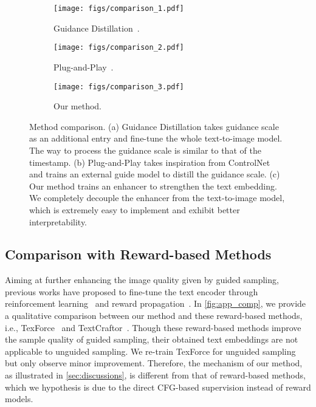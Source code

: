 \begin{figure*}[t]
\begin{center}
    \begin{subfigure}[t]{0.33\textwidth}
        \texttt{[image: figs/comparison\_1.pdf]}
        \caption{Guidance Distillation~\cite{meng2023distillation}.}
    \end{subfigure}
    \hfill
    \begin{subfigure}[t]{0.33\textwidth}
        \texttt{[image: figs/comparison\_2.pdf]}
        \caption{Plug-and-Play~\cite{hsiao2024plug}.}
    \end{subfigure}
    \hfill
    \begin{subfigure}[t]{0.33\textwidth}
        \texttt{[image: figs/comparison\_3.pdf]}
        \caption{Our method.}
    \end{subfigure}
    \caption{Method comparison. (a) Guidance Distillation takes guidance scale as an additional entry and fine-tune the whole text-to-image model. The way to process the guidance scale is similar to that of the timestamp. (b) Plug-and-Play takes inspiration from ControlNet~\cite{zhang2023adding} and trains an external guide model to distill the guidance scale. (c) Our method trains an enhancer to strengthen the text embedding. We completely decouple the enhancer from the text-to-image model, which is extremely easy to implement and exhibit better interpretability.}
    \label{fig:comparison_w_distillation}
\end{center}
\end{figure*}

\subsection{Comparison with Reward-based Methods}
\label{sec:comparison_w_reward}
Aiming at further enhancing the image quality given by guided sampling, previous works have proposed to fine-tune the text encoder through reinforcement learning~\cite{chen2025enhancing} and reward propagation~\cite{li2024textcraftor}. In \cref{fig:app_comp}, we provide a qualitative comparison between our method and these reward-based methods, i.e., TexForce~\cite{chen2025enhancing} and TextCraftor~\cite{li2024textcraftor}. Though these reward-based methods improve the sample quality of guided sampling, their obtained text embeddings are not applicable to unguided sampling. We re-train TexForce for unguided sampling but only observe minor improvement. Therefore, the mechanism of our method, as illustrated in \cref{sec:discussions}, is different from that of reward-based methods, which we hypothesis is due to the direct CFG-based supervision instead of reward models.

